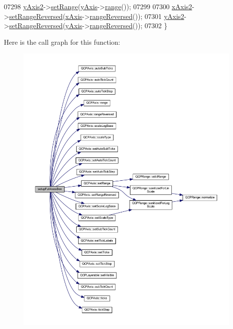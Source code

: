 \begin{DoxyCode}
07298   \hyperlink{a00116_a4fd6679232da7da0a1ae4e1b6ae83d6e}{yAxis2}->\hyperlink{a00025_a57d6ee9e9009fe88cb19db476ec70bca}{setRange}(\hyperlink{a00116_af168096ce67002b1fbce18ae5dd1b652}{yAxis}->\hyperlink{a00025_ab1ea79a4f5ea4cf42620f8f51c477ac4}{range}());
07299   
07300   \hyperlink{a00116_a058f6d3a4c86bf94c476e5c380711dba}{xAxis2}->\hyperlink{a00025_a2172fdb196b1a0dc3f40992fcad8e9e1}{setRangeReversed}(\hyperlink{a00116_a384438707adbcc96b0fa1324106f7129}{xAxis}->\hyperlink{a00025_ade26dc7994ccd8a11f64fd83377ee021}{rangeReversed}());
07301   \hyperlink{a00116_a4fd6679232da7da0a1ae4e1b6ae83d6e}{yAxis2}->\hyperlink{a00025_a2172fdb196b1a0dc3f40992fcad8e9e1}{setRangeReversed}(\hyperlink{a00116_af168096ce67002b1fbce18ae5dd1b652}{yAxis}->\hyperlink{a00025_ade26dc7994ccd8a11f64fd83377ee021}{rangeReversed}());
07302 \}
\end{DoxyCode}


Here is the call graph for this function\+:
\nopagebreak
\begin{figure}[H]
\begin{center}
\leavevmode
\includegraphics[width=350pt]{d4/d3e/a00116_ad27d34bcc9e68b5482d128e2f1e38f55_cgraph}
\end{center}
\end{figure}



